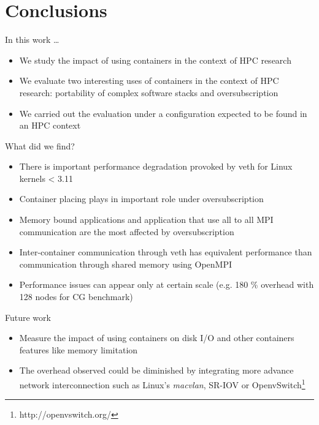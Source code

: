 \documentclass[presentation]{beamer}
\begin{document}
\section{Conclusions}
\label{sec-4}
\begin{frame}[label=sec-4-1]{In this work \ldots{}}
\begin{itemize}
\item We study the impact of using containers in the context of HPC research

\item We evaluate two interesting uses of containers in the context of HPC research: portability of complex software stacks
and oversubscription

\item We carried out the evaluation under a configuration expected to be found in an HPC context
\end{itemize}
\end{frame}

\begin{frame}[label=sec-4-2]{What did we find?}
\begin{itemize}
\item There is important performance degradation provoked by \alert{veth} for Linux kernels < 3.11
\item Container placing plays in important role under oversubscription
\item Memory bound applications and application that use \alert{all to all MPI} communication are
the most affected by oversubscription
\item Inter-container communication through \alert{veth} has equivalent performance than communication through shared memory using
OpenMPI
\item Performance issues can appear only at certain scale (e.g. \alert{180 \%} overhead with \alert{128} nodes for CG benchmark)
\end{itemize}
\end{frame}


\begin{frame}[label=sec-4-3]{Future work}
\begin{itemize}
\item Measure the impact of using containers on disk I/O and other
containers features like memory limitation

\item The overhead observed could be diminished by integrating
more advance network interconnection such as Linux's \emph{macvlan}, SR-IOV or OpenvSwitch\footnote{http://openvswitch.org/}
\end{itemize}
\end{frame}
\end{document}
